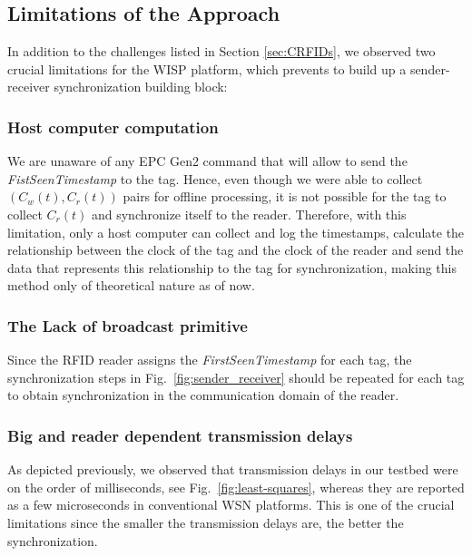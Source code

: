 \documentclass[10pt,journal,compsoc]{IEEEtran}
\begin{document}
\subsection{Limitations of the Approach}

In addition to the challenges listed in Section \ref{sec:CRFIDs}, we observed two crucial limitations for the WISP platform, which prevents to build up a sender-receiver synchronization building block:

\subsubsection{Host computer computation} We are unaware of any EPC Gen2 command that will allow to send the \emph{FistSeenTimestamp} to the tag. Hence, even though we were able to collect $(C_w(t),C_r(t))$ pairs for offline processing, it is not possible for the tag to collect $C_r(t)$ and synchronize itself to the reader. Therefore, with this limitation, only a host computer can collect and log the timestamps, calculate the relationship between the clock of the tag and the clock of the reader and send the data that represents this relationship to the tag for synchronization, making this method only of theoretical nature as of now. 

\subsubsection{The Lack of broadcast primitive} Since the RFID reader assigns the \emph{FirstSeenTimestamp} for each tag, the synchronization steps in Fig.~\ref{fig:sender_receiver} should be repeated for each tag to obtain synchronization in the communication domain of the reader. 

\subsubsection{Big and reader dependent transmission delays} As depicted previously, we observed that transmission delays in our testbed were on the order of milliseconds, see Fig.~\ref{fig:least-squares}, whereas they are reported as a few microseconds in conventional WSN platforms. This is one of the crucial limitations since the smaller the transmission delays are, the better the synchronization.
\end{document}
